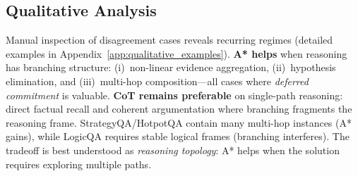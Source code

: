 \documentclass[11pt]{article}
\begin{document}






\subsection{Qualitative Analysis}
\label{sec:qualitative_conclusions}

Manual inspection of disagreement cases reveals recurring regimes (detailed examples in Appendix~\ref{app:qualitative_examples}). \textbf{A* helps} when reasoning has branching structure: (i)~non-linear evidence aggregation, (ii)~hypothesis elimination, and (iii)~multi-hop composition---all cases where \emph{deferred commitment} is valuable. \textbf{CoT remains preferable} on single-path reasoning: direct factual recall and coherent argumentation where branching fragments the reasoning frame. StrategyQA/HotpotQA contain many multi-hop instances (A* gains), while LogicQA requires stable logical frames (branching interferes). The tradeoff is best understood as \emph{reasoning topology}: A* helps when the solution requires exploring multiple paths.
\end{document}
